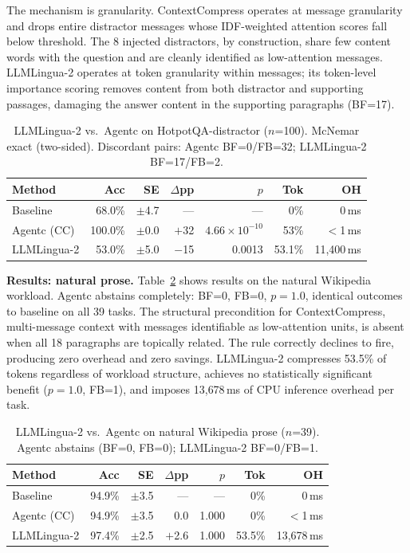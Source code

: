 The mechanism is granularity. ContextCompress operates at message granularity and
drops entire distractor messages whose IDF-weighted attention scores fall below
threshold. The 8 injected distractors, by construction, share few content words with
the question and are cleanly identified as low-attention messages. LLMLingua-2
operates at token granularity within messages; its token-level importance scoring
removes content from both distractor and supporting passages, damaging the answer
content in the supporting paragraphs (BF=17).

\begin{table}[t]
\caption{LLMLingua-2 vs.\ Agentc on HotpotQA-distractor ($n$=100).
McNemar exact (two-sided). Discordant pairs: Agentc BF=0/FB=32;
LLMLingua-2 BF=17/FB=2.}
\label{tab:llmlingua-distractor}
\footnotesize
\begin{tabularx}{\textwidth}{@{} l r r r r r r @{}}
\toprule
Method & Acc & SE & $\Delta$pp & $p$ & Tok & OH \\
\midrule
Baseline    & 68.0\% & $\pm$4.7 & --- & --- & 0\% & 0\,ms \\
Agentc (CC) & 100.0\% & $\pm$0.0 & $+$32 & $4.66\!\times\!10^{-10}$ & 53\% & $<$1\,ms \\
LLMLingua-2 & 53.0\%  & $\pm$5.0 & $-$15 & 0.0013 & 53.1\% & 11{,}400\,ms \\
\bottomrule
\end{tabularx}
\end{table}

\textbf{Results: natural prose.} Table~\ref{tab:llmlingua-wikipedia} shows results on
the natural Wikipedia workload. Agentc abstains completely: BF=0, FB=0, $p=1.0$,
identical outcomes to baseline on all 39 tasks. The structural precondition for
ContextCompress, multi-message context with messages identifiable as low-attention
units, is absent when all 18 paragraphs are topically related. The rule correctly
declines to fire, producing zero overhead and zero savings. LLMLingua-2 compresses
53.5\% of tokens regardless of workload structure, achieves no statistically
significant benefit ($p=1.0$, FB=1), and imposes 13{,}678\,ms of CPU inference
overhead per task.

\begin{table}[t]
\caption{LLMLingua-2 vs.\ Agentc on natural Wikipedia prose ($n$=39).
Agentc abstains (BF=0, FB=0); LLMLingua-2 BF=0/FB=1.}
\label{tab:llmlingua-wikipedia}
\footnotesize
\begin{tabularx}{\textwidth}{@{} l r r r r r r @{}}
\toprule
Method & Acc & SE & $\Delta$pp & $p$ & Tok & OH \\
\midrule
Baseline    & 94.9\% & $\pm$3.5 & --- & --- & 0\% & 0\,ms \\
Agentc (CC) & 94.9\% & $\pm$3.5 & 0.0 & 1.000 & 0\% & $<$1\,ms \\
LLMLingua-2 & 97.4\% & $\pm$2.5 & $+$2.6 & 1.000 & 53.5\% & 13{,}678\,ms \\
\bottomrule
\end{tabularx}
\end{table}


